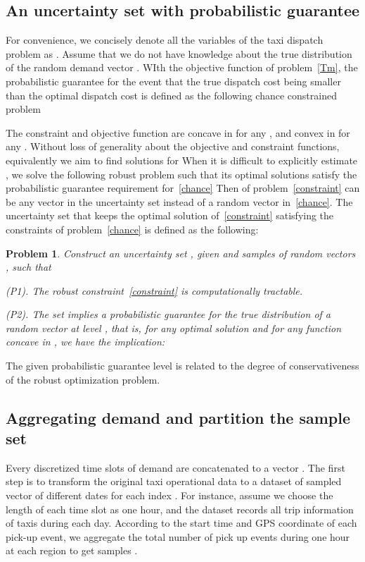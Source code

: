 \documentclass[10pt,twocolumn,twoside,english]{IEEEtran}
\newtheorem{problem}{Problem}
\begin{document}
\subsection{An uncertainty set with probabilistic guarantee}
For convenience, we concisely denote all the variables of the taxi dispatch problem as . Assume that we do not have knowledge about the true distribution  of the random demand vector . WIth the objective function  of problem~\eqref{Tm}, the probabilistic guarantee for the event that the true dispatch cost being smaller than the optimal dispatch cost is defined as the following chance constrained problem

The constraint  and objective function  are concave in  for any , and convex in  for any . Without loss of generality about the objective and constraint functions, equivalently we aim to find solutions for
When it is difficult to explicitly estimate , we solve the following robust problem such that its optimal solutions satisfy the probabilistic guarantee requirement for~\eqref{chance}
Then  of problem~\eqref{constraint} can be any vector in the uncertainty set  instead of a random vector in~\eqref{chance}. The uncertainty set that keeps the optimal solution of~\eqref{constraint} satisfying the constraints of problem~\eqref{chance} is defined as the following:
\begin{problem}
Construct an uncertainty set , given  and samples of random vectors , such that

(P1). The robust constraint~\eqref{constraint} is computationally tractable.

(P2). The set  implies a probabilistic guarantee for the true distribution  of a random vector  at level , that is, for any optimal solution  and for any function  concave in , we have the implication:
 
\label{prob_1}
\end{problem}
\vspace{-8pt}
The given probabilistic guarantee level  is related to the degree of conservativeness of the robust optimization problem. 

\subsection{Aggregating demand and partition the sample set}
Every  discretized time slots of demand  are concatenated to a vector . The first step is to transform the original taxi operational data to a dataset of sampled vector  of different dates  for each index . For instance, assume we choose the length of each time slot as one hour, and the dataset records all trip information of taxis during each day. According to the start time and GPS coordinate of each pick-up event, we aggregate the total number of pick up events during one hour at each region to get samples . 
\end{document}

